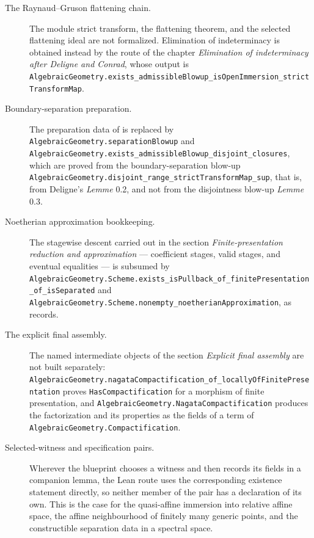 \begin{description}
  \item[The Raynaud--Gruson flattening chain.]  The module strict transform,
    the flattening theorem, and the selected flattening ideal are not
    formalized.  Elimination of indeterminacy is obtained instead by the
    route of the chapter \emph{Elimination of indeterminacy after Deligne and
    Conrad}, whose output is
    \texttt{AlgebraicGeometry.exists\_admissibleBlowup\_isOpenImmersion\_strictTransformMap}.

  \item[Boundary-separation preparation.]  The preparation data of
     is replaced by
    \texttt{AlgebraicGeometry.separationBlowup} and
    \texttt{AlgebraicGeometry.exists\_admissibleBlowup\_disjoint\_closures},
    which are proved from the boundary-separation blow-up
    \texttt{AlgebraicGeometry.disjoint\_range\_strictTransformMap\_sup}, that is, from
    Deligne's \emph{Lemme} 0.2, and not from the disjointness blow-up
    \emph{Lemme} 0.3.

  \item[Noetherian approximation bookkeeping.]  The stagewise descent carried
    out in the section \emph{Finite-presentation reduction and approximation}
    --- coefficient stages, valid stages, and eventual equalities --- is
    subsumed by
    \texttt{AlgebraicGeometry.Scheme.exists\_isPullback\_of\_finitePresentation\_of\_isSeparated}
    and \texttt{AlgebraicGeometry.Scheme.nonempty\_noetherianApproximation},
    as  records.

  \item[The explicit final assembly.]  The named intermediate objects of the
    section \emph{Explicit final assembly} are not built separately:
    \texttt{AlgebraicGeometry.nagataCompactification\_of\_locallyOfFinitePresentation}
    proves \texttt{HasCompactification} for a morphism of finite presentation, and
    \texttt{AlgebraicGeometry.NagataCompactification} produces the factorization and its
    properties as the fields of a term of
    \texttt{AlgebraicGeometry.Compactification}.

  \item[Selected-witness and specification pairs.]  Wherever the blueprint
    chooses a witness and then records its fields in a companion lemma, the
    Lean route uses the corresponding existence statement directly, so
    neither member of the pair has a declaration of its own.  This is the
    case for the quasi-affine immersion into relative affine space, the
    affine neighbourhood of finitely many generic points, and the
    constructible separation data in a spectral space.
\end{description}


